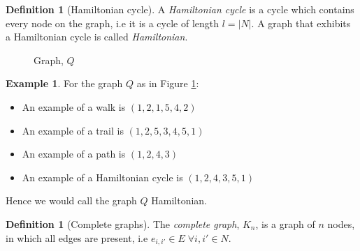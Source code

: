 \documentclass[a4paper,10pt]{article}
\theoremstyle{definition}
\newtheorem{definition}[theorem]{Definition}
\theoremstyle{definition}
\newtheorem{example}[theorem]{Example}
\theoremstyle{remark}
\theoremstyle{definition}
\begin{document}
\begin{definition}[Hamiltonian cycle]
A \textit{Hamiltonian cycle} is a cycle which contains every node on the graph, i.e it is a cycle of length $l=|N|$. A graph that exhibits a Hamiltonian cycle is called \textit{Hamiltonian}.
\end{definition}

\begin{figure}
\begin{center}
\end{center}
\caption{Graph, $Q$}
\label{figure: walks on graph Q}
\end{figure}

\begin{example}
For the graph $Q$ as in Figure \ref{figure: walks on graph Q}:
\begin{itemize}
\item An example of a walk is $(1,2,1,5,4,2)$
\item An example of a trail is $(1,2,5,3,4,5,1)$
\item An example of a path is $(1,2,4,3)$
\item An example of a Hamiltonian cycle is $(1,2,4,3,5,1)$
\end{itemize}
Hence we would call the graph $Q$ Hamiltonian.
\end{example}

\begin{definition}[Complete graphs]
The \textit{complete graph}, $K_{n}$, is a graph of $n$ nodes, in which all edges are present, i.e $e_{i,i'} \in E \; \forall i,i' \in N$.
\end{definition}
\end{document}
